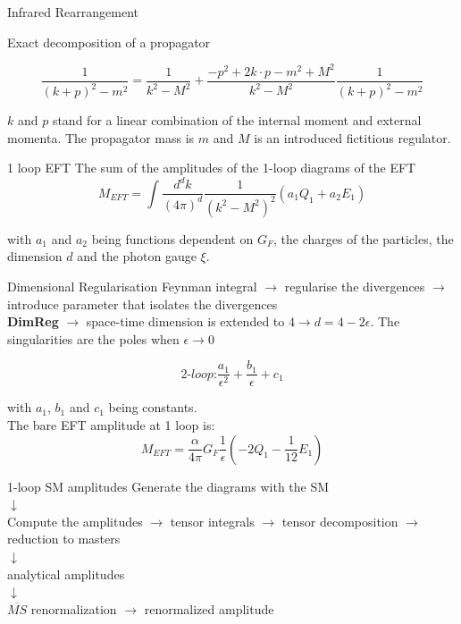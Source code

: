 \documentclass[11pt]{beamer}
\begin{document}
\begin{frame}{Infrared Rearrangement}

Exact decomposition of a propagator

\begin{equation} \label{IR rearr}
    \dfrac{1}{(k+p)^2-m^2} = \dfrac{1}{k^2-M^2} + \frac{-p^2+ 2 k \cdot p -m^2 + M^2}{k^2-M^2} \frac{1}{(k+p)^2 - m^2}
\end{equation}

 $k$ and $p$ stand for a linear combination of the internal moment and external momenta. The propagator mass is $m$ and $M$ is an introduced fictitious regulator. 
\end{frame}

\begin{frame}{1 loop EFT}
     The sum of the amplitudes of the 1-loop diagrams of the EFT 
\begin{equation}
    M_{EFT} = \int \frac{d^dk}{(4 \pi)^d} \frac{1}{(k^2-M^2)^2}(a_1 Q_1 + a_2 E_1)
\end{equation}

with $a_1$ and $a_2$ being functions dependent on $G_F$, the charges of the particles, the dimension $d$ and the photon gauge $\xi$.
\end{frame}

\begin{frame}{Dimensional Regularisation}
Feynman integral $\longrightarrow$ regularise the divergences $\longrightarrow$ introduce parameter that isolates the divergences 
\\
\vspace{.5cm}
\textbf{DimReg} $\longrightarrow$ space-time dimension is extended to $ 4 \longrightarrow d=4-2\epsilon$. The singularities are the poles when $\epsilon \longrightarrow 0$ 

\begin{equation}
    \textit{2-loop:} \frac{a_1}{\epsilon^2} + \frac{b_1}{\epsilon} + c_1
\end{equation}

with $a_1$, $b_1$ and $c_1$ being constants.\\
\vspace{.1 cm}
The bare EFT amplitude at 1 loop is:
    \begin{equation}
    M_{EFT} = \frac{\alpha}{4 \pi} G_F \frac{1}{\epsilon} (-2 Q_1 - \frac{1}{12} E_1)
\end{equation}
\end{frame}

\begin{frame}{1-loop SM amplitudes}
\centering
    Generate the diagrams with the SM\\
$\downarrow$\\
    Compute the amplitudes $\longrightarrow$ tensor integrals $\longrightarrow$ tensor decomposition $\longrightarrow$ reduction to masters\\
$\downarrow$\\
analytical amplitudes\\
$\downarrow$\\
    $\overline{MS}$ renormalization $\longrightarrow$ renormalized amplitude
\end{frame}
\end{document}
